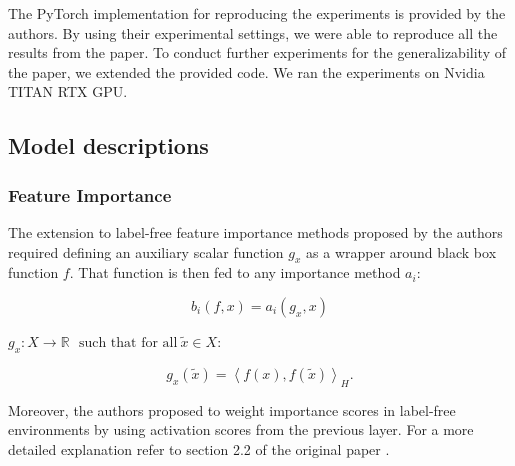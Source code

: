The PyTorch implementation for reproducing the experiments is provided by the authors. By using their experimental settings, we were able to reproduce all the results from the paper. To conduct further experiments for the generalizability of the paper, we extended the provided code. We ran the experiments on Nvidia TITAN RTX GPU.


\subsection{Model descriptions}


\subsubsection{Feature Importance}

The extension to label-free feature importance methods proposed by the authors required defining an auxiliary scalar function $g_x$ as a wrapper around black box function $f$. That function is then fed to any importance method $a_i$:

\begin{equation}
    b_i\left(f,x\right)=a_i\left(g_x,x\right)
\end{equation}
\begin{center}
    $g_x:X\rightarrow\mathbb{R}\ \ \ \text{such\ that\ for\ all}\ \widetilde{x}\in X:$
\end{center}
\begin{equation}
     g_x\left(\widetilde{x}\right)=\left\langle f\left(x\right),f\left(\widetilde{x}\right)\right\rangle_H .
\end{equation}

Moreover, the authors proposed to weight importance scores in label-free environments by using activation scores from the previous layer. For a more detailed explanation refer to section 2.2 of the original paper \cite{originalpaper}.

